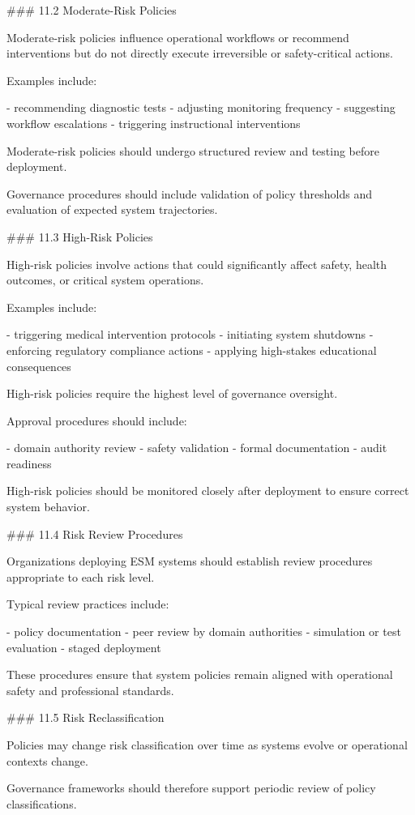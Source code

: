 ### 11.2 Moderate-Risk Policies

Moderate-risk policies influence operational workflows or recommend interventions but do not directly execute irreversible or safety-critical actions.

Examples include:

- recommending diagnostic tests
- adjusting monitoring frequency
- suggesting workflow escalations
- triggering instructional interventions

Moderate-risk policies should undergo structured review and testing before deployment.

Governance procedures should include validation of policy thresholds and evaluation of expected system trajectories.

### 11.3 High-Risk Policies

High-risk policies involve actions that could significantly affect safety, health outcomes, or critical system operations.

Examples include:

- triggering medical intervention protocols
- initiating system shutdowns
- enforcing regulatory compliance actions
- applying high-stakes educational consequences

High-risk policies require the highest level of governance oversight.

Approval procedures should include:

- domain authority review
- safety validation
- formal documentation
- audit readiness

High-risk policies should be monitored closely after deployment to ensure correct system behavior.

### 11.4 Risk Review Procedures

Organizations deploying ESM systems should establish review procedures appropriate to each risk level.

Typical review practices include:

- policy documentation
- peer review by domain authorities
- simulation or test evaluation
- staged deployment

These procedures ensure that system policies remain aligned with operational safety and professional standards.

### 11.5 Risk Reclassification

Policies may change risk classification over time as systems evolve or operational contexts change.

Governance frameworks should therefore support periodic review of policy classifications.


